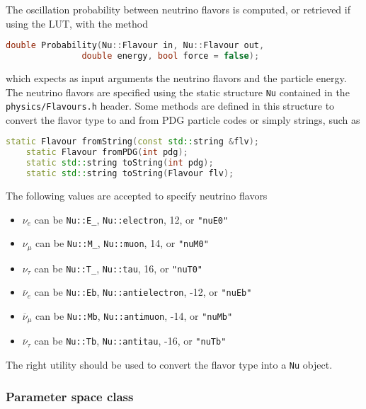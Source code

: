 \documentclass[a4paper, 11pt]{article}
\newcommand{\cj}{\overline}
\begin{document}
The oscillation probability between neutrino flavors is computed, or retrieved if using the LUT, with the method
\begin{lstlisting}[language=C++]
    double Probability(Nu::Flavour in, Nu::Flavour out,
		       double energy, bool force = false);
\end{lstlisting}
which expects as input arguments the neutrino flavors and the particle energy.
The neutrino flavors are specified using the static structure \texttt{Nu} contained in the \texttt{physics/Flavours.h} header.
Some methods are defined in this structure to convert the flavor type to and from PDG particle codes or simply strings,
such as
\begin{lstlisting}[language=C++]
    static Flavour fromString(const std::string &flv);
    static Flavour fromPDG(int pdg);
    static std::string toString(int pdg);
    static std::string toString(Flavour flv);
\end{lstlisting}
The following values are accepted to specify neutrino flavors
\begin{itemize}
		\small
	\item $\nu_e$         can be \texttt{Nu::E\_}, \texttt{Nu::electron}, 12, or \texttt{"nuE0"}
	\item $\nu_\mu$       can be \texttt{Nu::M\_}, \texttt{Nu::muon}, 14, or \texttt{"nuM0"}
	\item $\nu_\tau$      can be \texttt{Nu::T\_}, \texttt{Nu::tau}, 16, or \texttt{"nuT0"}
	\item $\cj{\nu}_e$    can be \texttt{Nu::Eb}, \texttt{Nu::antielectron}, -12, or \texttt{"nuEb"}
	\item $\cj{\nu}_\mu$  can be \texttt{Nu::Mb}, \texttt{Nu::antimuon}, -14, or \texttt{"nuMb"}
	\item $\cj{\nu}_\tau$ can be \texttt{Nu::Tb}, \texttt{Nu::antitau}, -16, or \texttt{"nuTb"}
\end{itemize}
The right utility should be used to convert the flavor type into a \texttt{Nu} object.


\subsubsection{Parameter space class}
\label{sec:parameter_space}
\end{document}
